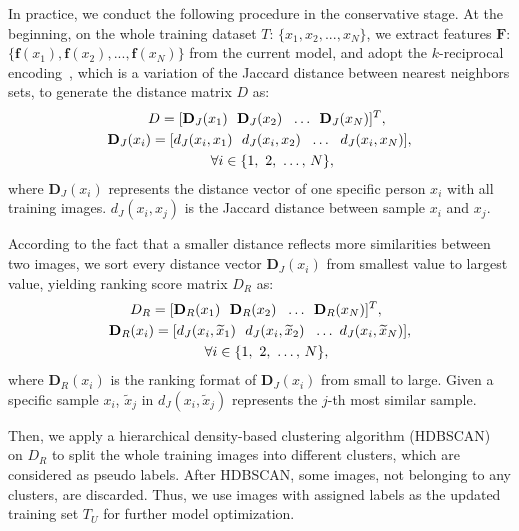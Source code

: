 \documentclass[10pt,twocolumn,letterpaper]{article}
\begin{document}
In practice, we conduct the following procedure in the conservative stage. At the beginning, on the whole training dataset $T$: $\lbrace x_1, x_2, ..., x_N \rbrace$, we extract features $\mathbf{F}$: $\{ \mathbf{f}(x_1), \mathbf{f}(x_2), ..., \mathbf{f}(x_{N})\}$ from the current model, and adopt the $k$-reciprocal encoding~\cite{rerank}, which is a variation of the Jaccard distance between nearest neighbors sets, to generate the distance matrix $D$ as:
\begin{equation}
\setlength{\abovedisplayskip}{0.1cm}
\setlength{\belowdisplayskip}{0.1cm}
\begin{split}
D = [\textbf{D}_{J}(x_{1})~~\textbf{D}_{J}(x_{2})~~\ldots&~~\textbf{D}_{J}(x_{N})] ^T,\\
\textbf{D}_{J}(x_{i}) = [ d_{J}(x_{i}, x_{1})~~d_{J}(x_{i}, x_{2})~~&\ldots~~d_{J}(x_{i}, x_{N})],\\
\forall i\in \{1,~2,~\ldots,~&N\},
\end{split}
\label{eq:distance}
\end{equation}    
where $\textbf{D}_{J}(x_{i})$ represents the distance vector of one specific person $x_{i}$ with all training images. $d_{J}(x_{i}, x_{j})$ is the Jaccard distance between sample $x_i$ and $x_j$.

According to the fact that a smaller distance reflects more similarities between two images, we sort every distance vector $\textbf{D}_{J}(x_{i})$ from smallest value to largest value, yielding ranking score matrix $D_R$ as:
\begin{equation}
\setlength{\abovedisplayskip}{0.1cm}
\setlength{\belowdisplayskip}{0.1cm}
\begin{split}
D_R = [\textbf{D}_{R}(x_{1})~~\textbf{D}_{R}(x_{2})~~\ldots&~~\textbf{D}_{R}(x_{N})]^T,\\
\textbf{D}_{R}(x_{i}) = [ d_{J}(x_{i}, \widetilde{x}_{1})~~d_{J}(x_{i}, \widetilde{x}_{2})&~~\ldots~d_{J}(x_{i}, \widetilde{x}_{N})],\\
\forall i\in \{1,~2,~\ldots,~&N\},
\end{split}
\label{eq:similarity}
\end{equation}
where $\textbf{D}_{R}(x_{i})$ is the ranking format of $\textbf{D}_{J}(x_{i})$ from small to large. Given a specific sample $x_i$, $\widetilde{x}_{j}$ in $d_{J}(x_{i}, \widetilde{x}_{j})$ represents the $j$-th most similar sample.

Then, we apply a hierarchical density-based clustering algorithm (HDBSCAN)~\cite{HDBSCAN} on $D_R$ to split the whole training images into different clusters, which are considered as pseudo labels. After HDBSCAN, some images, not belonging to any clusters, are discarded. Thus, we use images with assigned labels as the updated training set $T_U$ for further model optimization. 
\end{document}
